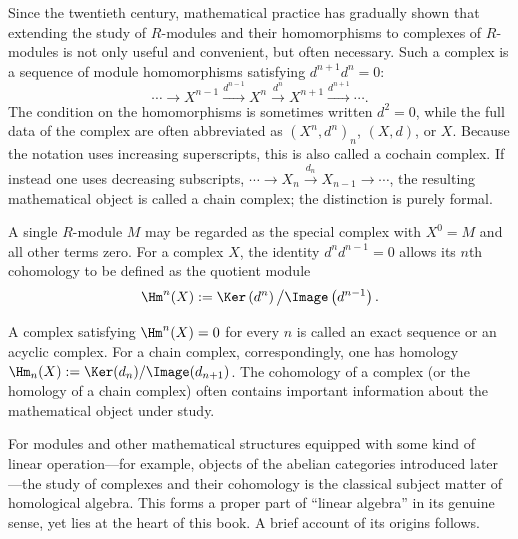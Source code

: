 Since the twentieth century, mathematical practice has gradually shown that extending the study of $R$-modules and their homomorphisms to complexes of $R$-modules is not only useful and convenient, but often necessary. Such a complex is a sequence of module homomorphisms satisfying $d^{n+1}d^n=0$:
\[
  \cdots \longrightarrow X^{n-1} \xrightarrow{d^{n-1}} X^n
  \xrightarrow{d^n} X^{n+1} \xrightarrow{d^{n+1}} \cdots .
\]
The condition on the homomorphisms is sometimes written $d^2=0$, while the full data of the complex are often abbreviated as $(X^n,d^n)_n$, $(X,d)$, or $X$. Because the notation uses increasing superscripts, this is also called a cochain complex. If instead one uses decreasing subscripts, $\cdots\to X_n\xrightarrow{d_n}X_{n-1}\to\cdots$, the resulting mathematical object is called a chain complex; the distinction is purely formal.

A single $R$-module $M$ may be regarded as the special complex with $X^0=M$ and all other terms zero. For a complex $X$, the identity $d^nd^{n-1}=0$ allows its $n$th cohomology to be defined as the quotient module
\[
  \Hm^n(X):=\Ker\left(d^n\right)\big/\Image\left(d^{n-1}\right).
\]

A complex satisfying $\Hm^n(X)=0$ for every $n$ is called an exact sequence or an acyclic complex. For a chain complex, correspondingly, one has homology $\Hm_n(X):=\Ker(d_n)/\Image(d_{n+1})$. The cohomology of a complex (or the homology of a chain complex) often contains important information about the mathematical object under study.

\enlargethispage{3\baselineskip}
For modules and other mathematical structures equipped with some kind of linear operation---for example, objects of the abelian categories introduced later---the study of complexes and their cohomology is the classical subject matter of homological algebra. This forms a proper part of ``linear algebra'' in its genuine sense, yet lies at the heart of this book. A brief account of its origins follows.
